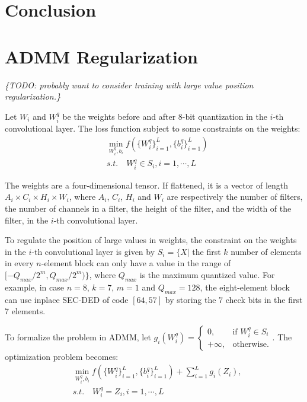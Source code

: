 \documentclass{article}
\newcommand{\TODO}[1]{{\it \color{blue}\{TODO: #1\}}}
\begin{document}
\section{Conclusion}

 



\appendix

\section{ADMM Regularization}

\TODO{probably want to consider training with large value position regularization.}

Let $W_i$ and $W_i^q$ be the weights before and after 8-bit quantization in the $i$-th convolutional layer. 
The loss function subject to some constraints on the weights:
\begin{align}
    & \min_{W_i^q, b_i} f(\{W_i^q\}_{i=1}^{L}, \{b_i^q\}_{i=1}^L) \\
    & s.t. \quad W_i^q \in S_i, i = 1, \cdots, L 
\end{align}

The weights are a four-dimensional tensor. If flattened, it is a vector of length $A_i\times C_i \times H_i \times W_i$, where $A_i$, $C_i$, $H_i$ and $W_i$ are respectively the number of filters, the number of channels in a filter, the height of the filter, and the width of the filter, in the $i$-th convolutional layer. 

To regulate the position of large values in weights, the constraint on the weights in the $i$-th convolutional layer is given by $S_i = \{X|$ the first $k$ number of elements in every $n$-element block can only have a value in the range of $[-Q_{max}/2^m, Q_{max}/2^m)\}$, where $Q_{max}$ is the maximum quantized value. For example, in case $n=8$, $k=7$, $m=1$ and $Q_{max}=128$, the eight-element block can use inplace SEC-DED of code $[64, 57]$ by storing the $7$ check bits in the first 7 elements. 

To formalize the problem in ADMM, let 
$g_i(W_i^q) = \begin{cases}
    0,& \text{if } W_i^q \in S_i\\
    +\infty,              & \text{otherwise}.
\end{cases}$. The optimization problem becomes:
\begin{align}
    & \min_{W_i^q, b_i} f(\{W_i^q\}_{i=1}^{L}, \{b_i^q\}_{i=1}^L) + \sum_{i=1}^{L}{g_i(Z_i)}, \\
    & s.t. \quad W_i^q = Z_i, i = 1, \cdots, L 
\end{align}
\end{document}

